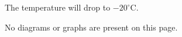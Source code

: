 The temperature will drop to \( -20^\circ\text{C} \).  

No diagrams or graphs are present on this page.